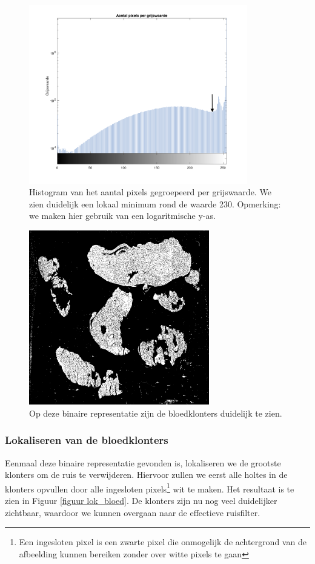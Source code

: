 \documentclass[a4paper,kulak]{kulakarticle}
\begin{document}
	\begin{figure}[H]
		\centering
		\includegraphics[width=0.85\textwidth]{GetBestthreshold_vb_aangeduid.png}
		
		\caption{Histogram van het aantal pixels gegroepeerd per grijswaarde. We zien duidelijk een lokaal minimum rond de waarde 230. Opmerking: we maken hier gebruik van een logaritmische y-as.}
		\label{figuur graf1}
	\end{figure}

	\begin{figure}[H]
		\centering
		\includegraphics[width=0.7\textwidth]{grijswaarden_bin_vb}
		\caption{Op deze binaire representatie zijn de bloedklonters duidelijk te zien.}
		\label{figuur foto_bin}
	\end{figure}
	
	\subsubsection{Lokaliseren van de bloedklonters}
		Eenmaal deze binaire representatie gevonden is, lokaliseren we de grootste klonters om de ruis te verwijderen. Hiervoor zullen we eerst alle holtes in de klonters opvullen door alle ingesloten pixels\footnote{Een ingesloten pixel is een zwarte pixel die onmogelijk de achtergrond van de afbeelding kunnen bereiken zonder over witte pixels te gaan} wit te maken. Het resultaat is te zien in Figuur \ref{figuur lok_bloed}. De klonters zijn nu nog veel duidelijker zichtbaar, waardoor we kunnen overgaan naar de effectieve ruisfilter.
\end{document}
